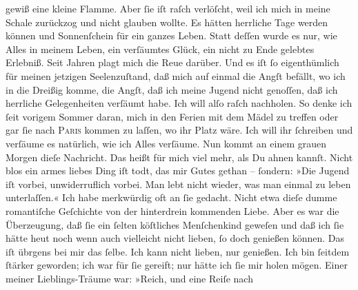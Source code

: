 \begin{ledgroupsized}[t]{13cm}
               gewiß eine kleine Flamme. Aber ſie iſt {\pb}raſch
               verlöſcht, weil ich mich in meine Schale zurückzog und nicht glauben wollte. Es
               hätten herrliche Tage werden können und Sonnenſchein für ein ganzes Leben. Statt
               deſſen wurde es nur, wie Alles in meinem Leben, ein verſäumtes Glück, ein nicht zu
               Ende gelebtes Erlebniß. Seit Jahren plagt mich die Reue darüber. Und es iſt ſo
               eigenthümlich für meinen jetzigen Seelenzuſtand, daß mich auf einmal die Angſt
               befällt, wo ich in die Dreißig komme, die Angſt, daß ich \strikeout{\textcolor{gray}{d}} meine Jugend nicht genoſſen, daß ich herrliche
               Gelegenheiten verſäumt habe. Ich will alſo raſch nachholen. So denke ich ſeit vorigem
               Sommer daran, mich in den Ferien {\pb}mit dem Mädel zu treffen oder gar ſie
               nach \textsc{Paris} kommen zu
               laſſen, wo ihr Platz wäre. Ich will ihr ſchreiben und verſäume es natürlich, wie ich
               Alles verſäume. Nun kommt an einem grauen Morgen dieſe Nachricht. Das heißt für mich
               viel mehr, als Du ahnen kannſt. Nicht blos ein armes liebes Ding iſt todt, das mir Gutes gethan –
               ſondern: »Die Jugend iſt vorbei, unwiderruflich vorbei. Man lebt nicht wieder, was
               man einmal zu leben unterlaſſen.«\pend
           \pstart
           Ich habe merkwürdig oft an ſie gedacht. Nicht etwa dieſe dumme romantiſche Geſchichte
               von der hinterdrein kommenden Liebe. Aber  es war
               die Überzeugung, daß ſie ein
               ſelten köſtliches Menſchenkind
               geweſen {\pb}und daß ich ſie hätte heut noch wenn auch vielleicht nicht lieben, ſo doch
               genießen können. Das iſt übrgens bei mir das ſelbe. Ich kann nicht lieben, nur
               genießen. Ich bin ſeitdem ſtärker geworden; ich war für ſie gereift; nur hätte ich
               ſie mir holen mögen. Einer meiner Lieblings-Träume war: »Reich, und eine Reiſe nach

\end{ledgroupsized}
